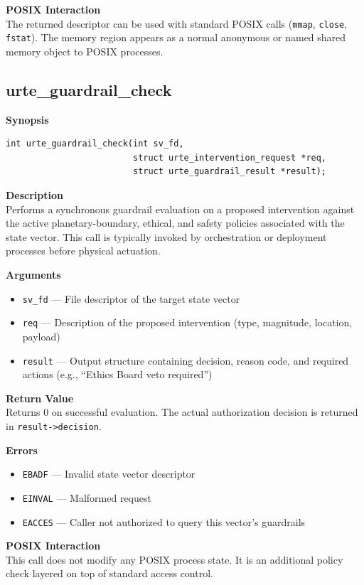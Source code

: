 \documentclass[11pt,a4paper]{report}
\begin{document}
\textbf{POSIX Interaction}\\
The returned descriptor can be used with standard POSIX calls (\texttt{mmap}, \texttt{close}, \texttt{fstat}). The memory region appears as a normal anonymous or named shared memory object to POSIX processes.

\subsection{urte\_guardrail\_check}

\textbf{Synopsis}
\begin{verbatim}
int urte_guardrail_check(int sv_fd,
                         struct urte_intervention_request *req,
                         struct urte_guardrail_result *result);
\end{verbatim}

\textbf{Description}\\
Performs a synchronous guardrail evaluation on a proposed intervention against the active planetary-boundary, ethical, and safety policies associated with the state vector. This call is typically invoked by orchestration or deployment processes before physical actuation.

\textbf{Arguments}
\begin{itemize}
    \item \texttt{sv\_fd} — File descriptor of the target state vector
    \item \texttt{req} — Description of the proposed intervention (type, magnitude, location, payload)
    \item \texttt{result} — Output structure containing decision, reason code, and required actions (e.g., ``Ethics Board veto required'')
\end{itemize}

\textbf{Return Value}\\
Returns 0 on successful evaluation. The actual authorization decision is returned in \texttt{result->decision}.

\textbf{Errors}
\begin{itemize}
    \item \texttt{EBADF} — Invalid state vector descriptor
    \item \texttt{EINVAL} — Malformed request
    \item \texttt{EACCES} — Caller not authorized to query this vector's guardrails
\end{itemize}

\textbf{POSIX Interaction}\\
This call does not modify any POSIX process state. It is an additional policy check layered on top of standard access control.
\end{document}
